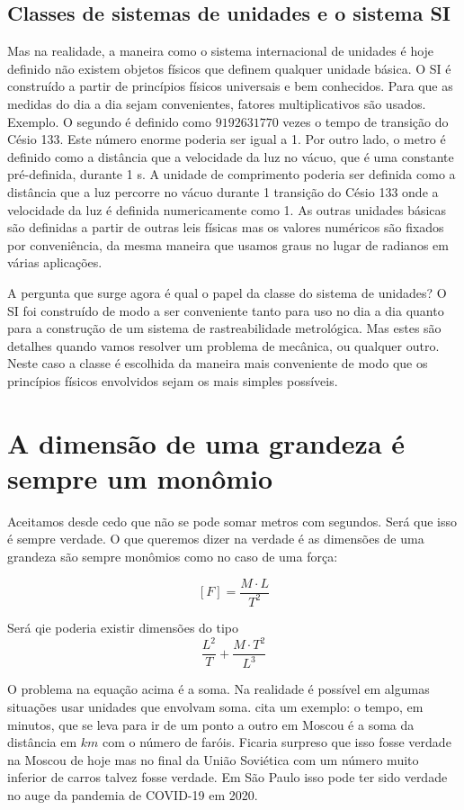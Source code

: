 \subsection{Classes de sistemas de unidades e o sistema SI}

Mas na realidade, a maneira como o sistema internacional de unidades é hoje definido não existem objetos físicos que definem qualquer unidade básica. O SI é construído a partir de princípios físicos universais e bem conhecidos. Para que as medidas do dia a dia sejam convenientes, fatores multiplicativos são usados. Exemplo. O segundo é definido como $9 192 631 770$ vezes o tempo de transição do Césio 133. Este número enorme poderia ser igual a 1. Por outro lado, o metro é definido como a distância que a velocidade da luz no vácuo, que é uma constante pré-definida, durante 1 s. A unidade de comprimento poderia ser definida como a distância que a luz percorre no vácuo durante 1 transição do Césio 133 onde a velocidade da luz é definida numericamente como 1. As outras unidades básicas são definidas a partir de outras leis físicas mas os valores numéricos são fixados por conveniência, da mesma maneira que usamos graus no lugar de radianos em várias aplicações.

A pergunta que surge agora é qual o papel da classe do sistema de unidades? O SI  foi construído de modo a ser conveniente tanto para uso no dia a dia quanto para a construção de um sistema de rastreabilidade metrológica. Mas estes são detalhes quando vamos resolver um problema de mecânica, ou qualquer outro. Neste caso a classe é escolhida da maneira mais conveniente de modo que os princípios físicos envolvidos sejam os mais simples possíveis. 






\section{A dimensão de uma grandeza é sempre um monômio}

Aceitamos desde cedo que não se pode somar metros com segundos. Será que isso é sempre verdade. O que queremos dizer na verdade é as dimensões de uma grandeza são sempre monômios como no caso de uma força:

\[
  [F] = \frac{M\cdot L}{T^2}
\]

Será qie poderia existir dimensões do tipo
\[
\frac{L^2}{T} + \frac{M\cdot T^2}{L^3}
\]

O problema na equação acima é a soma. Na realidade é possível em algumas situações usar unidades que envolvam soma. \cite{Barenblatt96} cita um exemplo: o tempo, em minutos, que se leva para ir de um ponto a outro em Moscou é a soma da distância em $km$ com o número de faróis. Ficaria surpreso que isso fosse verdade na Moscou de hoje mas no final da União Soviética com um número muito inferior de carros talvez fosse verdade. Em São Paulo isso pode ter sido verdade no auge da pandemia de COVID-19 em 2020.

